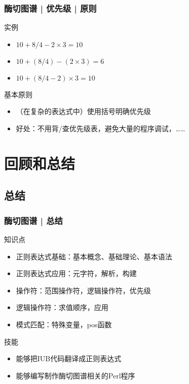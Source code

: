 \begin{frame}
  \frametitle{酶切图谱 | 优先级 | 原则}
  \begin{block}{实例}
    \begin{itemize}
      \item $10 + 8 / 4 - 2 \times 3 = 10$
      \item $10 + (8 / 4) - (2 \times 3) = 6$
      \item $10 + (8 / 4 - 2) \times 3 = 10$
    \end{itemize}
  \end{block}
  \pause
  \begin{block}{\alert{基本原则}}
    \begin{itemize}
      \item （在复杂的表达式中）使用括号明确优先级
      \item 好处：不用背/查优先级表，避免大量的程序调试，……
    \end{itemize}
  \end{block}
\end{frame}

\section{回顾和总结}
\subsection{总结}
\begin{frame}
  \frametitle{酶切图谱 | 总结}
  \begin{block}{知识点}
    \begin{itemize}
      \item 正则表达式基础：基本概念、基础理论、基本语法
      \item 正则表达式应用：元字符，解析，构建
      \item 操作符：范围操作符，逻辑操作符，优先级
      \item 逻辑操作符：求值顺序，应用
      \item 模式匹配：特殊变量，pos函数
    \end{itemize}
  \end{block}
  \pause
  \begin{block}{技能}
    \begin{itemize}
      \item 能够把IUB代码翻译成正则表达式
      \item 能够编写制作酶切图谱相关的Perl程序
    \end{itemize}
  \end{block}
\end{frame}

